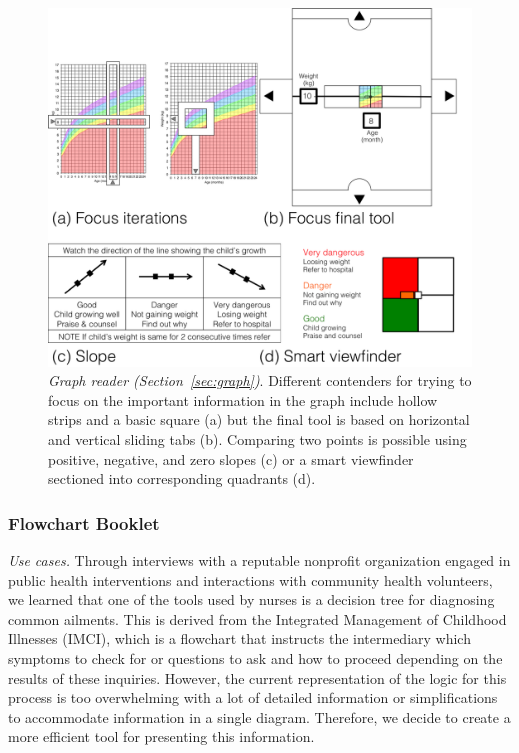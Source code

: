 \documentclass{sig-alternate}
\begin{document}
\begin{figure}
\centering
\includegraphics[width=\linewidth]{img/graph.png}
\caption{\emph{Graph reader (Section~\ref{sec:graph})}. Different contenders for trying to focus on the important information in the graph include hollow strips and a basic square (a) but the final tool is based on horizontal and vertical sliding tabs (b). Comparing two points is possible using positive, negative, and zero slopes (c) or a smart viewfinder sectioned into corresponding quadrants (d).}
\label{fig:graph}
\end{figure}

\subsubsection{Flowchart Booklet}
\label{sec:flowchart}

\emph{Use cases.}
Through interviews with a reputable nonprofit organization engaged in public health interventions and interactions with community health volunteers, we learned that one of the tools used by nurses is a decision tree for diagnosing common ailments. This is derived from the Integrated Management of Childhood Illnesses (IMCI), which is a flowchart that instructs the intermediary which symptoms to check for or questions to ask and how to proceed depending on the results of these inquiries. However, the current representation of the logic for this process is too overwhelming with a lot of detailed information or simplifications to accommodate information in a single diagram. Therefore, we decide to create a more efficient tool for presenting this information.
\end{document}
